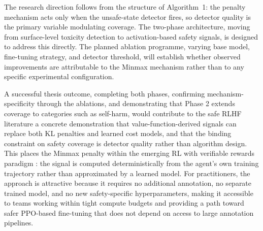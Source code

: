 \documentclass[a4paper,twoside,12pt]{report}
\begin{document}
The research direction follows from the structure of Algorithm~1: the penalty mechanism
acts only when the unsafe-state detector fires, so detector quality is the primary variable
modulating coverage. The two-phase architecture, moving from surface-level toxicity
detection to activation-based safety signals, is designed to address this directly. The
planned ablation programme, varying base model, fine-tuning strategy, and detector
threshold, will establish whether observed improvements are attributable to the Minmax
mechanism rather than to any specific experimental configuration.

A successful thesis outcome, completing both phases, confirming mechanism-specificity
through the ablations, and demonstrating that Phase 2 extends coverage to categories such
as self-harm, would contribute to the safe RLHF literature a concrete demonstration that
value-function-derived signals can replace both KL penalties and learned cost models, and
that the binding constraint on safety coverage is detector quality rather than algorithm
design. This places the Minmax penalty within the emerging RL with verifiable rewards
paradigm \citep{lambert2024rlvr, shao2024deepseekmath, safetyrlvr2025}: the signal is
computed deterministically from the agent's own training trajectory rather than
approximated by a learned model. For practitioners, the approach is attractive because it
requires no additional annotation, no separate trained model, and no new safety-specific
hyperparameters, making it accessible to teams working within tight compute budgets and
providing a path toward safer PPO-based fine-tuning that does not depend on access to
large annotation pipelines.


\end{document}
